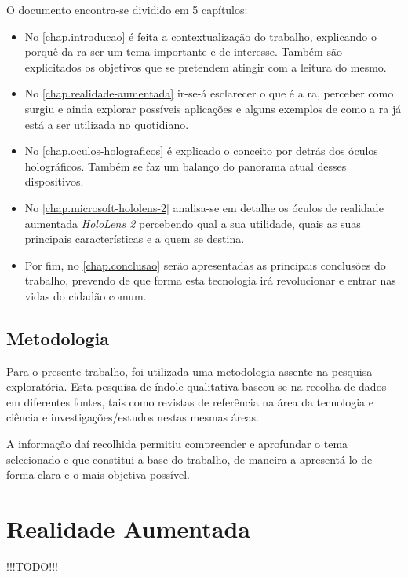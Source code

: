 \documentclass{report}
\begin{document}
O documento encontra-se dividido em 5 capítulos:
\begin{itemize}
    \item No \autoref{chap.introducao} é feita a contextualização do trabalho, explicando o porquê da \ac{ra} ser um tema importante e de interesse. Também são explicitados os objetivos que se pretendem atingir com a leitura do mesmo.
    \item No \autoref{chap.realidade-aumentada} ir-se-á esclarecer o que é a \ac{ra}, perceber como surgiu e ainda explorar possíveis aplicações e alguns exemplos de como a \ac{ra} já está a ser utilizada no quotidiano.
    \item No \autoref{chap.oculos-holograficos} é explicado o conceito por detrás dos óculos holográficos. Também se faz um balanço do panorama atual desses dispositivos.
    \item No \autoref{chap.microsoft-hololens-2} analisa-se em detalhe os óculos de realidade aumentada \textit{HoloLens 2} percebendo qual a sua utilidade, quais as suas principais características e a quem se destina.
    \item Por fim, no \autoref{chap.conclusao} serão apresentadas as principais conclusões do trabalho, prevendo de que forma esta tecnologia irá revolucionar e entrar nas vidas do cidadão comum.
\end{itemize}

\section{Metodologia}
Para o presente trabalho, foi utilizada uma metodologia assente na pesquisa exploratória. Esta pesquisa de índole qualitativa baseou-se na recolha de dados em diferentes fontes, tais como revistas de referência na área da tecnologia e ciência e investigações/estudos nestas mesmas áreas.

A informação daí recolhida permitiu compreender e aprofundar o tema selecionado e que constitui a base do trabalho, de maneira a apresentá-lo de forma clara e o mais objetiva possível.

\chapter{Realidade Aumentada}
\label{chap.realidade-aumentada}
!!!TODO!!!
\end{document}
